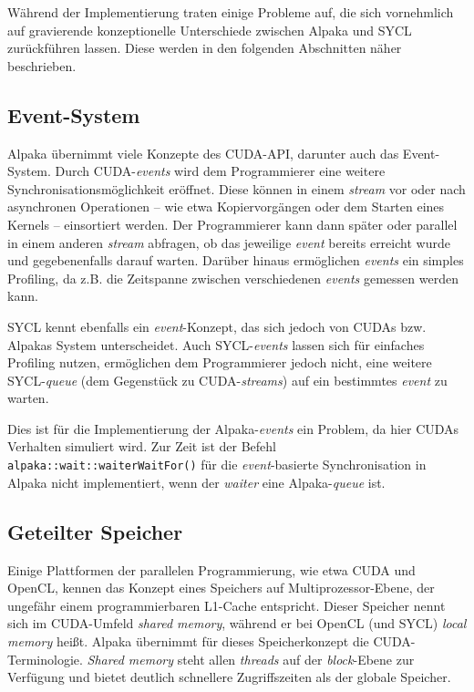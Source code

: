 Während der Implementierung traten einige Probleme auf, die sich vornehmlich
auf gravierende konzeptionelle Unterschiede zwischen Alpaka und SYCL
zurückführen lassen. Diese werden in den folgenden Abschnitten näher
beschrieben.

\subsection{Event-System}\label{implementierung:probleme:events}

Alpaka übernimmt viele Konzepte des CUDA-API, darunter auch das Event-System.
Durch CUDA-\textit{events} wird dem Programmierer eine weitere
Synchronisationsmöglichkeit eröffnet. Diese können in einem \textit{stream} vor
oder nach asynchronen Operationen -- wie etwa Kopiervorgängen oder dem Starten
eines Kernels -- einsortiert werden. Der Programmierer kann dann später oder
parallel in einem anderen \textit{stream} abfragen, ob das jeweilige
\textit{event} bereits erreicht wurde und gegebenenfalls darauf warten. Darüber
hinaus ermöglichen \textit{events} ein simples Profiling, da z.B. die Zeitspanne
zwischen verschiedenen \textit{events} gemessen werden kann.

SYCL kennt ebenfalls ein \textit{event}-Konzept, das sich jedoch von CUDAs bzw.
Alpakas System unterscheidet. Auch SYCL-\textit{events} lassen sich für
einfaches Profiling nutzen, ermöglichen dem Programmierer jedoch nicht, eine
weitere SYCL-\textit{queue} (dem Gegenstück zu CUDA-\textit{streams}) auf ein
bestimmtes \textit{event} zu warten.

Dies ist für die Implementierung der Alpaka-\textit{events} ein Problem, da hier
CUDAs Verhalten simuliert wird. Zur Zeit ist der Befehl
\texttt{alpaka::wait::waiterWaitFor()} für die \textit{event}-basierte
Synchronisation in Alpaka nicht implementiert, wenn der \textit{waiter} eine
Alpaka-\textit{queue} ist.

\subsection{Geteilter Speicher}\label{implementierung:probleme:shared}

Einige Plattformen der parallelen Programmierung, wie etwa CUDA und OpenCL,
kennen das Konzept eines Speichers auf Multiprozessor-Ebene, der ungefähr
einem programmierbaren L1-Cache entspricht. Dieser Speicher nennt sich im
CUDA-Umfeld \textit{shared memory}, während er bei OpenCL (und SYCL)
\textit{local memory} heißt. Alpaka übernimmt für dieses Speicherkonzept die
CUDA-Terminologie. \textit{Shared memory} steht allen \textit{threads} auf
der \textit{block}-Ebene zur Verfügung und bietet deutlich schnellere
Zugriffszeiten als der globale Speicher.

